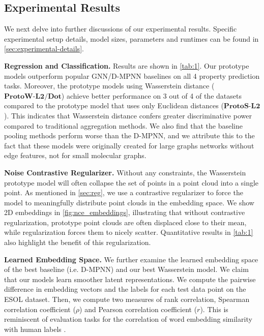 \documentclass[letterpaper]{article} \usepackage{aaai22}  \usepackage{times}  \usepackage{helvet}  \usepackage{courier}  \usepackage[hyphens]{url}  \usepackage{graphicx} \urlstyle{rm} \def\UrlFont{\rm}  \usepackage{natbib}  \usepackage{caption} \DeclareCaptionStyle{ruled}{labelfont=normalfont,labelsep=colon,strut=off} \frenchspacing  \setlength{\pdfpagewidth}{8.5in}  \setlength{\pdfpageheight}{11in}  \usepackage{algorithm}
\begin{document}
\subsection{Experimental Results} \label{sec:contrastive-samples}
We next delve into further discussions of our experimental results. Specific experimental setup details, model sizes, parameters and runtimes can be found in \cref{sec:experimental-details}.

\textbf{Regression and Classification. } Results are shown in \cref{tab:1}. Our prototype models outperform popular GNN/D-MPNN baselines on all 4 property prediction tasks. Moreover, the prototype models using Wasserstein distance ($\mathbf{ProtoW\text{-}L2/Dot}$) achieve better performance on 3 out of 4 of the datasets compared to the prototype model that uses only Euclidean distances ($\mathbf{ProtoS\text{-}L2}$). This indicates that Wasserstein distance confers greater discriminative power compared to traditional aggregation methods. We also find that the baseline pooling methods perform worse than the D-MPNN, and we attribute this to the fact that these models were originally created for large graphs networks without edge features, not for small molecular graphs. 



\textbf{Noise Contrastive Regularizer. } Without any constraints, the Wasserstein prototype model will often collapse the set of points in a point cloud into a single point. As mentioned in \cref{sec:reg}, we use a contrastive regularizer to force the model to meaningfully distribute point clouds in the embedding space. We show 2D embeddings in \cref{fig:nce_embeddings}, illustrating that without contrastive regularization, prototype point clouds are often displaced close to their mean, while  regularization forces them to nicely scatter. Quantitative results in \cref{tab:1} also highlight the benefit of this regularization.

\textbf{Learned Embedding Space. } We further examine the learned embedding space of the best baseline (i.e. D-MPNN) and our best Wasserstein model. We claim that our models learn smoother latent representations. We compute the pairwise difference in embedding vectors and the labels for each test data point on the ESOL dataset. Then, we compute two measures of rank correlation, Spearman correlation coefficient ($\rho$) and Pearson correlation coefficient ($r$). This is reminiscent of evaluation tasks for the correlation of word embedding similarity with human labels \citep{luong2013better}.
\end{document}
